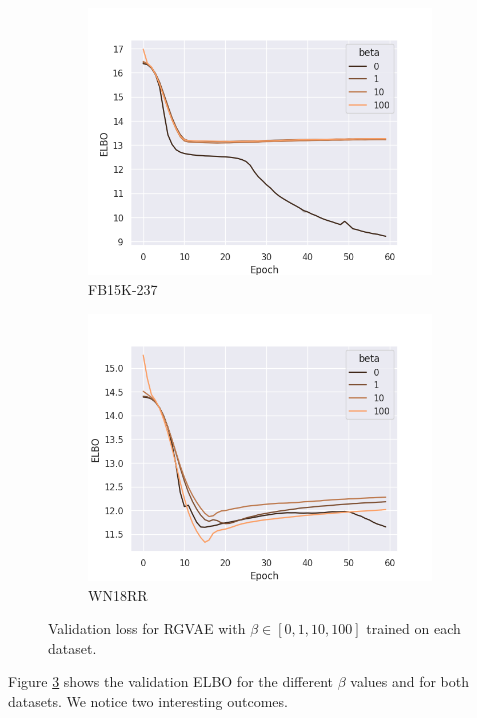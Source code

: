 \begin{figure}[H]
    \centering
    \begin{subfigure}{.5\textwidth}
      \centering
      \includegraphics[width=.9\linewidth]{graphs/plots/beta_loss_fb.png}
      \caption{FB15K-237}
      \label{fig5:betafb}
    \end{subfigure}%
    \begin{subfigure}{.5\textwidth}
      \centering
      \includegraphics[width=.9\linewidth]{graphs/plots/beta_loss_wn.png}
      \caption{WN18RR}
      \label{fig5:betawn}
    \end{subfigure}
    \caption{Validation loss for RGVAE with $\beta \in [0,1,10,100]$ trained on each dataset.}
    \label{fig5:beta}
\end{figure}


Figure \ref{fig5:beta} shows the validation ELBO for the different $\beta$ values and for both datasets. We notice two interesting outcomes.  

